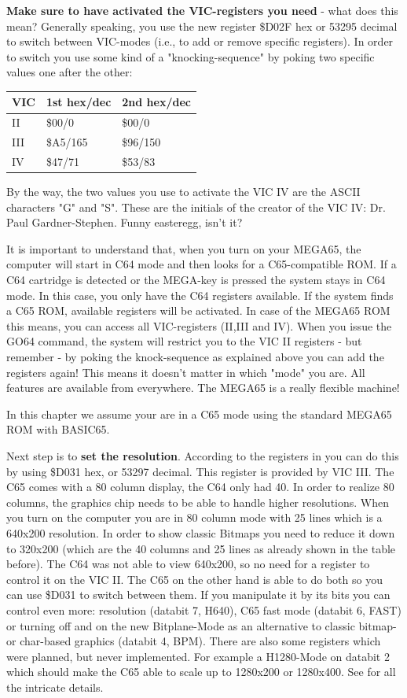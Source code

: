 \textbf{Make sure to have activated the VIC-registers you need} - what does this mean? Generally speaking, you use the new register \$D02F hex or 53295 decimal to switch between VIC-modes (i.e., to add or remove specific registers). In order to switch you use some kind of a "knocking-sequence" by poking two specific values one after the other: 

\begin{tabular}{|l|l|l|}
	\hline
	VIC & 1st hex/dec & 2nd hex/dec \\
	\hline
	II  & \$00/0 & \$00/0\\
	III & \$A5/165 & \$96/150\\
	IV  & \$47/71 & \$53/83\\	
	\hline
\end{tabular}

By the way, the two values you use to activate the VIC IV are the ASCII characters "G" and "S". These are the initials of the creator of the VIC IV: Dr. Paul Gardner-Stephen. Funny easteregg, isn't it? 

It is important to understand that, when you turn on your MEGA65, the computer will start in C64 mode and then looks for a C65-compatible ROM. If a C64 cartridge is detected or the MEGA-key is pressed the system stays in C64 mode. In this case, you only have the C64 registers available. If the system finds a C65 ROM, available registers will be activated. In case of the MEGA65 ROM this means, you can access all VIC-registers (II,III and IV). When you issue the GO64 command, the system will restrict you to the VIC II registers - but remember - by poking the knock-sequence as explained above you can add the registers again! This means it doesn't matter in which "mode" you are. All features are available from everywhere. The MEGA65 is a really flexible machine!


In this chapter we assume your are in a C65 mode using the standard MEGA65 ROM with BASIC65.


Next step is to \textbf{set the resolution}. According to the registers in  you can do this by using \$D031 hex, or 53297 decimal. This register is provided by VIC III. The C65 comes with a 80 column display, the C64 only had 40. In order to realize 80 columns, the graphics chip needs to be able to handle higher resolutions. When you turn on the computer you are in 80 column mode with 25 lines which is a 640x200 resolution. In order to show classic Bitmaps you need to reduce it down to 320x200 (which are the 40 columns and 25 lines as already shown in the table before). The C64 was not able to view 640x200, so no need for a register to control it on the VIC II. The C65 on the other hand is able to do both so you can use \$D031 to switch between them.  If you manipulate it by its bits you can control even more: resolution (databit 7, H640), C65 fast mode (databit 6, FAST) or turning off and on the new Bitplane-Mode as an alternative to classic bitmap- or char-based graphics (databit 4, BPM). There are also some registers which were planned, but never implemented. For example a H1280-Mode on databit 2 which should make the C65 able to scale up to 1280x200 or 1280x400. See  for all the intricate details.

